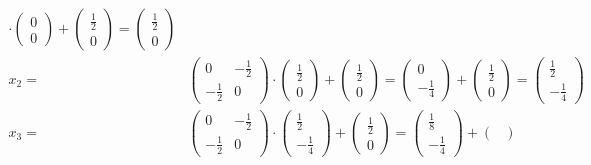 \documentclass[a4paper,10pt]{article}
\begin{document}
\begin{enumerate}[a)]
\begin{align*}
			\cdot
			\begin{pmatrix}
			0\\
			0
			\end{pmatrix}
			+
			\begin{pmatrix}
			\frac{1}{2}\\
			0
			\end{pmatrix}
			=
			\begin{pmatrix}
			\frac{1}{2}\\
			0
			\end{pmatrix}\\
			x_2 = &
			\begin{pmatrix}
			0 & -\frac{1}{2}\\[2pt]
			-\frac{1}{2} & 0
			\end{pmatrix} 
			\cdot
			\begin{pmatrix}
			\frac{1}{2}\\
			0
			\end{pmatrix}
			+
			\begin{pmatrix}
			\frac{1}{2}\\
			0
			\end{pmatrix}
			=
			\begin{pmatrix}
			0\\
			-\frac{1}{4}
			\end{pmatrix}
			+
			\begin{pmatrix}
			\frac{1}{2}\\
			0
			\end{pmatrix}
			=
			\begin{pmatrix}
			\frac{1}{2}\\[2pt]
			-\frac{1}{4}
			\end{pmatrix}\\
			x_3 = &
			\begin{pmatrix}
			0 & -\frac{1}{2}\\[2pt]
			-\frac{1}{2} & 0
			\end{pmatrix} 
			\cdot
			\begin{pmatrix}
			\frac{1}{2}\\[2pt]
			-\frac{1}{4}
			\end{pmatrix}
			+
			\begin{pmatrix}
			\frac{1}{2}\\
			0
			\end{pmatrix}
			=
			\begin{pmatrix}
			\frac{1}{8}\\[2pt]
			-\frac{1}{4}
			\end{pmatrix}
			+
			\begin{pmatrix}

\end{pmatrix}
\end{align*}
\end{enumerate}
\end{document}

